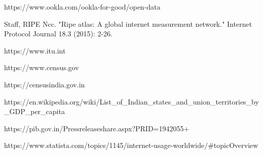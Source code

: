 \documentclass[conference]{IEEEtran}
\begin{document}
\begin{thebibliography}{00}
 https://www.ookla.com/ookla-for-good/open-data

 Staff, RIPE Ncc. "Ripe atlas: A global internet measurement network." Internet Protocol Journal 18.3 (2015): 2-26.

 https://www.itu.int

 https://www.census.gov

 https://censusindia.gov.in

 https://en.wikipedia.org/wiki/List_of_Indian_states_and_union_territories_by_GDP_per_capita

 https://pib.gov.in/Pressreleaseshare.aspx?PRID=1942055+

 https://www.statista.com/topics/1145/internet-usage-worldwide/#topicOverview



\end{thebibliography}
\vspace{12pt}
\end{document}
